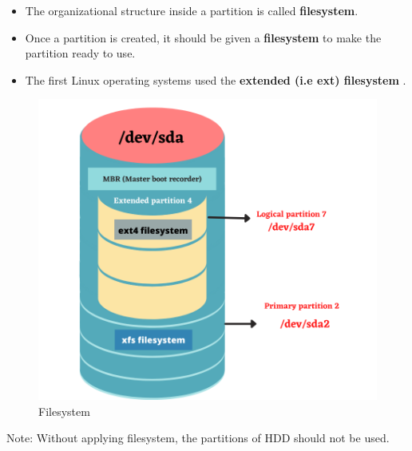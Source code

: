 \setlength{\columnsep}{3pt}
\begin{flushleft}
	
\begin{itemize}
	\item The organizational structure inside a partition is called \textbf{filesystem}.
	\item Once a partition is created, it should be given a \textbf{filesystem} to make the partition ready to use.
	\item The first Linux operating systems used the \textbf{extended (i.e ext) filesystem }.
\end{itemize}

\begin{figure}[h!]
	\centering
	\includegraphics[scale=.6]{content/chapter8/images/newfilesystem.png}
	\caption{Filesystem}
	\label{filesystem}
\end{figure}

\begin{tcolorbox}[breakable,notitle,boxrule=1pt,colback=yellow,colframe=yellow]
	\color{black}
	Note: Without applying filesystem, the partitions of HDD should not be used.
\end{tcolorbox}


\newpage

\end{flushleft}
